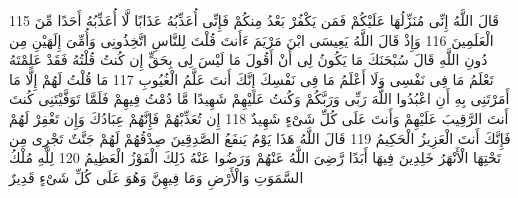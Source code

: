 \documentclass[20pt,a4paper]{article}
\begin{document}
{\tiny\colorbox{cl_aya}{115}} قَالَ اللَّهُ إِنِّى مُنَزِّلُهَا عَلَيْكُمْ فَمَن يَكْفُرْ بَعْدُ مِنكُمْ فَإِنِّى أُعَذِّبُهُ عَذَابًا لَّا أُعَذِّبُهُ أَحَدًا مِّنَ الْعَلَمِينَ
{\tiny\colorbox{cl_aya}{116}} وَإِذْ قَالَ اللَّهُ يَعِيسَى ابْنَ مَرْيَمَ ءَأَنتَ قُلْتَ لِلنَّاسِ اتَّخِذُونِى وَأُمِّىَ إِلَهَيْنِ مِن دُونِ اللَّهِ قَالَ سُبْحَنَكَ مَا يَكُونُ لِى أَنْ أَقُولَ مَا لَيْسَ لِى بِحَقٍّ إِن كُنتُ قُلْتُهُ فَقَدْ عَلِمْتَهُ تَعْلَمُ مَا فِى نَفْسِى وَلَا أَعْلَمُ مَا فِى نَفْسِكَ إِنَّكَ أَنتَ عَلَّمُ الْغُيُوبِ
{\tiny\colorbox{cl_aya}{117}} مَا قُلْتُ لَهُمْ إِلَّا مَا أَمَرْتَنِى بِهِ أَنِ اعْبُدُوا اللَّهَ رَبِّى وَرَبَّكُمْ وَكُنتُ عَلَيْهِمْ شَهِيدًا مَّا دُمْتُ فِيهِمْ فَلَمَّا تَوَفَّيْتَنِى كُنتَ أَنتَ الرَّقِيبَ عَلَيْهِمْ وَأَنتَ عَلَى كُلِّ شَىْءٍ شَهِيدٌ
{\tiny\colorbox{cl_aya}{118}} إِن تُعَذِّبْهُمْ فَإِنَّهُمْ عِبَادُكَ وَإِن تَغْفِرْ لَهُمْ فَإِنَّكَ أَنتَ الْعَزِيزُ الْحَكِيمُ
{\tiny\colorbox{cl_aya}{119}} قَالَ اللَّهُ هَذَا يَوْمُ يَنفَعُ الصَّدِقِينَ صِدْقُهُمْ لَهُمْ جَنَّتٌ تَجْرِى مِن تَحْتِهَا الْأَنْهَرُ خَلِدِينَ فِيهَا أَبَدًا رَّضِىَ اللَّهُ عَنْهُمْ وَرَضُوا عَنْهُ ذَلِكَ الْفَوْزُ الْعَظِيمُ
{\tiny\colorbox{cl_aya}{120}} لِلَّهِ مُلْكُ السَّمَوَتِ وَالْأَرْضِ وَمَا فِيهِنَّ وَهُوَ عَلَى كُلِّ شَىْءٍ قَدِيرٌ
\end{document}
